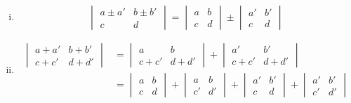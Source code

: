 \begin{description}
\begin{enumerate}[i)]
            \item \[
                    \begin{vmatrix}
                        a\pm a' & b\pm b'\\
                        c & d 
                    \end{vmatrix}
                    =
                    \begin{vmatrix}
                        a & b \\
                        c & d 
                    \end{vmatrix}
                    \pm
                    \begin{vmatrix}
                        a' & b' \\
                        c & d 
                    \end{vmatrix}
                \]

            \item \begin{align*}
                    \begin{vmatrix}
                        a + a' & b + b' \\
                        c + c' & d + d'
                    \end{vmatrix}
&=
\begin{vmatrix}
    a & b \\
    c + c' & d + d'
\end{vmatrix}
+
\begin{vmatrix}
    a' & b' \\
    c+c' & d+d' 
\end{vmatrix} 
\\[10pt]
&= 
\begin{vmatrix}
    a & b \\
    c & d
\end{vmatrix}
+
\begin{vmatrix}
    a & b \\
    c' & d' 
\end{vmatrix}
+ 
\begin{vmatrix}
    a' &  b' \\
    c & d 
\end{vmatrix}
+
\begin{vmatrix}
    a' & b' \\
    c' & d'
\end{vmatrix}
                \end{align*}

        \end{enumerate}



\end{description}
